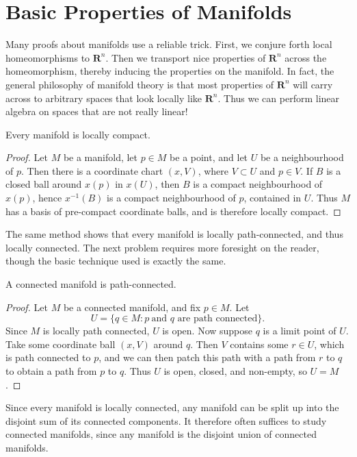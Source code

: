 \section{Basic Properties of Manifolds}

Many proofs about manifolds use a reliable trick. First, we conjure forth local homeomorphisms to $\mathbf{R}^n$. Then we transport nice properties of $\mathbf{R}^n$ across the homeomorphism, thereby inducing the properties on the manifold. In fact, the general philosophy of manifold theory is that most properties of $\mathbf{R}^n$ will carry across to arbitrary spaces that look locally like $\mathbf{R}^n$. Thus we can perform linear algebra on spaces that are not really linear!

\begin{theorem}
    Every manifold is locally compact.
\end{theorem}
\begin{proof}
    Let $M$ be a manifold, let $p \in M$ be a point, and let $U$ be a neighbourhood of $p$. Then there is a coordinate chart $(x,V)$, where $V \subset U$ and $p \in V$. If $B$ is a closed ball around $x(p)$ in $x(U)$, then $B$ is a compact neighbourhood of $x(p)$, hence $x^{-1}(B)$ is a compact neighbourhood of $p$, contained in $U$. Thus $M$ has a basis of pre-compact coordinate balls, and is therefore locally compact.
\end{proof}

The same method shows that every manifold is locally path-connected, and thus locally connected. The next problem requires more foresight on the reader, though the basic technique used is exactly the same.

\begin{theorem}
    A connected manifold is path-connected.
\end{theorem}
\begin{proof}
    Let $M$ be a connected manifold, and fix $p \in M$. Let
    \[ U = \{ q \in M: p\ \text{and $q$ are path connected} \}. \]
    Since $M$ is locally path connected, $U$ is open. Now suppose $q$ is a limit point of $U$. Take some coordinate ball $(x,V)$ around $q$. Then $V$ contains some $r \in U$, which is path connected to $p$, and we can then patch this path with a path from $r$ to $q$ to obtain a path from $p$ to $q$. Thus $U$ is open, closed, and non-empty, so $U = M$.
\end{proof}

Since every manifold is locally connected, any manifold can be split up into the disjoint sum of its connected components. It therefore often suffices to study connected manifolds, since any manifold is the disjoint union of connected manifolds.

